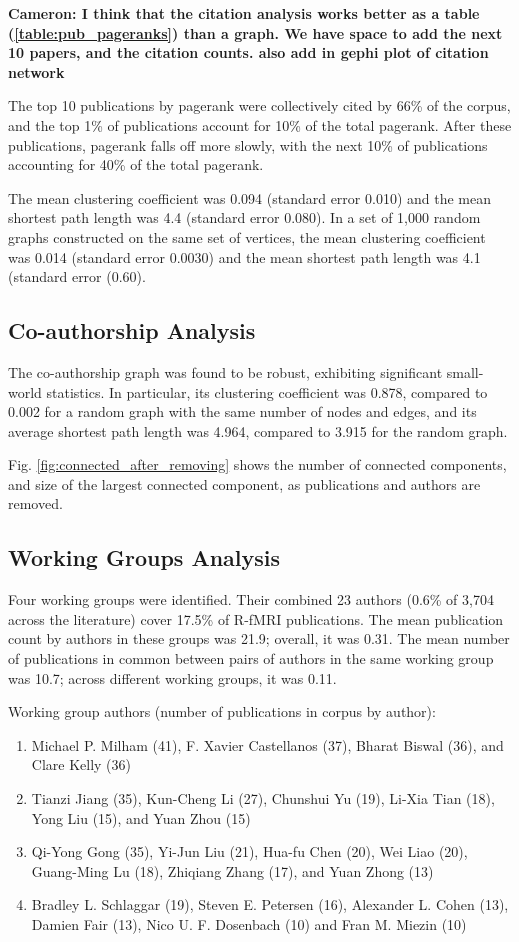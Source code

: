 \documentclass[12pt,5p]{elsarticle}
\newcommand\MyCBox[1]{%
  \colorbox{yellow!60}{\begin{varwidth}{\dimexpr\linewidth-2\fboxsep}#1\end{varwidth}}}
\newcommand{\COMMENTCC}[1]{\MyCBox{\textcolor{cc_commentcolor}{\textbf{Cameron:
#1}}}}
\begin{document}
\COMMENTCC{I think that the citation analysis  works better as a table
	(\ref{table:pub_pageranks}) than a graph. We have space to add the next
	10 papers, and the citation counts. also add in gephi plot of citation
	network} 

The top 10 publications by pagerank were collectively cited by 66\% of the
corpus, and the top 1\% of publications account for 10\% of the total
pagerank.  After these publications, pagerank falls off more slowly, with
the next 10\% of publications accounting for 40\% of the total pagerank. 

The mean clustering coefficient was 0.094 (standard error 0.010) and the
mean shortest path length was 4.4 (standard error 0.080). In a set of
1,000 random graphs constructed on the same set of vertices, the mean
clustering coefficient was 0.014 (standard error 0.0030) and the mean
shortest path length was 4.1 (standard error (0.60).

\subsection{Co-authorship Analysis} The co-authorship graph was found to
be robust, exhibiting significant small-world statistics. In particular,
its clustering coefficient was 0.878, compared to 0.002 for a random graph
with the same number of nodes and edges, and its average shortest path
length was 4.964, compared to 3.915 for the random graph.

Fig. \ref{fig:connected_after_removing} shows the number of connected components, and
size of the largest connected component, as publications and authors are
removed.  

\subsection{Working Groups Analysis}
Four working groups were identified. Their combined 23 authors (0.6\% of
3,704 across the literature) cover 17.5\% of R-fMRI publications. The mean
publication count by authors in these groups was 21.9; overall, it was
0.31. The mean number of publications in common between pairs of authors
in the same working group was 10.7; across different working groups, it
was 0.11.  

Working group authors (number of publications in corpus by author):
\begin{enumerate}
\item Michael P. Milham (41), F. Xavier Castellanos (37), Bharat Biswal
(36), and Clare Kelly (36)
\item Tianzi Jiang (35), Kun-Cheng Li (27), Chunshui Yu (19), Li-Xia Tian
(18), Yong Liu (15), and Yuan Zhou (15)
\item Qi-Yong Gong (35), Yi-Jun Liu (21), Hua-fu Chen (20), Wei Liao (20),
Guang-Ming Lu (18), Zhiqiang Zhang (17), and Yuan Zhong (13) 
\item Bradley L. Schlaggar (19), Steven E. Petersen (16), Alexander L.
Cohen (13), Damien Fair (13), Nico U. F. Dosenbach (10) and Fran M. Miezin
(10)
\end{enumerate}
\end{document}
